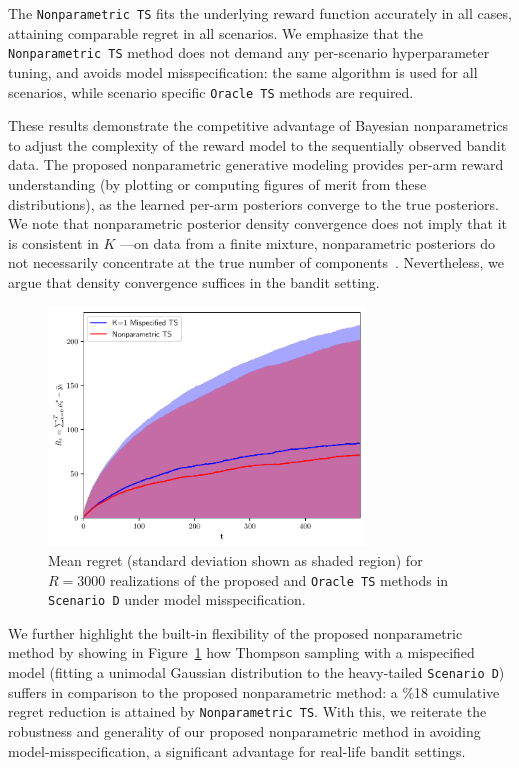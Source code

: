 The \texttt{Nonparametric TS} fits the underlying reward function accurately in all cases, attaining comparable regret in all scenarios.
We emphasize that the \texttt{Nonparametric TS} method does not demand any per-scenario hyperparameter tuning, and avoids model misspecification: \ie the same algorithm is used for all scenarios, while scenario specific \texttt{Oracle TS} methods are required.

These results demonstrate the competitive advantage of Bayesian nonparametrics to adjust the complexity of the reward model to the sequentially observed bandit data.
The proposed nonparametric generative modeling provides per-arm reward understanding (by plotting or computing figures of merit from these distributions), as the learned per-arm posteriors converge to the true posteriors.
We note that nonparametric posterior density convergence does not imply that it is consistent in $K$ ---on data from a finite mixture, nonparametric posteriors do not necessarily concentrate at the true number of components~\citep{j-Miller2014}. Nevertheless, we argue that density convergence suffices in the bandit setting.

\begin{figure}[!h]
	\centering
	\includegraphics[width=0.75\textwidth]{./figs/linearGaussianMixture/heavy/cumregret_R3250_mispecified}
	\vspace*{-5ex}
	\caption{Mean regret (standard deviation shown as shaded region) for $R=3000$ realizations of the proposed and \texttt{Oracle TS} methods in \texttt{Scenario D} under model misspecification.}
	\label{fig:mixture_scenarios_misspecified}
	\vspace*{-2ex}
\end{figure}

We further highlight the built-in flexibility of the proposed nonparametric method by showing in Figure~\ref{fig:mixture_scenarios_misspecified} how Thompson sampling with a mispecified model (\ie fitting a unimodal Gaussian distribution to the heavy-tailed \texttt{Scenario D}) suffers in comparison to the proposed nonparametric method: a \%18 cumulative regret reduction is attained by \texttt{Nonparametric TS}.
With this, we reiterate the robustness and generality of our proposed nonparametric method in avoiding model-misspecification, a significant advantage for real-life bandit settings.